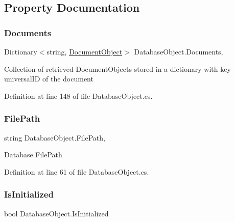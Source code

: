 \subsection{Property Documentation}
\mbox{\label{class_database_object_afaf1159aa427c5bcce01c4b8c6f34514}} 
\subsubsection{\texorpdfstring{Documents}{Documents}}
{\footnotesize\ttfamily Dictionary$<$string, \hyperlink{class_document_object}{Document\+Object}$>$ Database\+Object.\+Documents\hspace{0.3cm}{\ttfamily [get]}, {\ttfamily [set]}}



Collection of retrieved Document\+Objects stored in a dictionary with key universal\+ID of the document 



Definition at line 148 of file Database\+Object.\+cs.

\mbox{\label{class_database_object_a38a1a78430c6cd1fc4eef054e39145ce}} 
\subsubsection{\texorpdfstring{File\+Path}{FilePath}}
{\footnotesize\ttfamily string Database\+Object.\+File\+Path\hspace{0.3cm}{\ttfamily [get]}, {\ttfamily [set]}}



Database File\+Path 



Definition at line 61 of file Database\+Object.\+cs.

\mbox{\label{class_database_object_a5fe036d32a30eb10d1b3f6a30263f740}} 
\subsubsection{\texorpdfstring{Is\+Initialized}{IsInitialized}}
{\footnotesize\ttfamily bool Database\+Object.\+Is\+Initialized\hspace{0.3cm}{\ttfamily [get]}}



